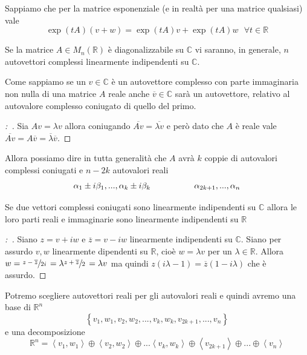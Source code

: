 \documentclass[11pt,a4paper,twoside]{book}
\newenvironment{dimo}[1][\proofname]{
	\begin{tcolorbox}[
	breakable, 
	enhanced, 
	interior hidden, 
	frame hidden, 
	borderline west = {1pt}{0pt}{gray}, 
	top=0pt, bottom=0pt, left=0pt]
\begin{proof}[#1:~]
}
{
\end{proof}
\end{tcolorbox}
}
\theoremstyle{esss}
\theoremstyle{dotless}
\numberwithin{equation}{section} %
\begin{document}
Sappiamo che per la matrice esponenziale (e in realtà per una matrice qualsiasi) vale
\[
\exp{(tA)}(v+w)=\exp{(tA)}v + \exp{(tA)}w \>\>\> \forall t\in\mathbb{R}
\]

Se la matrice $A\in M_n(\mathbb{R})$ è diagonalizzabile su $\mathbb{C}$ vi saranno, in generale, $n$ autovettori complessi linearmente indipendenti su $\mathbb{C}$.

Come sappiamo se un $v\in \mathbb{C}$ è un autovettore complesso con parte immaginaria non nulla di una matrice $A$ reale  anche $\overline{v}\in\mathbb{C}$ sarà un autovettore, relativo al autovalore complesso coniugato di quello del primo.
\begin{dimo}
Sia $Av=\lambda v$ allora coniugando $\overline{Av}=\overline{\lambda v}$ e però dato che $A$ è reale vale $\overline{Av}=A\overline{v}=\overline{\lambda}\overline{v}$.
\end{dimo}

Allora possiamo dire in tutta generalità che $A$ avrà $k$ coppie di autovalori complessi coniugati e $n-2k$ autovalori reali
\[
\alpha_1 \pm i \beta_1 ,..., \alpha_k \pm i \beta_k \hspace{0.15\linewidth} \alpha_{2k+1},...,\alpha_n
\]


Se due vettori complessi coniugati sono linearmente indipendenti su $\mathbb{C}$ allora le loro parti reali e immaginarie sono linearmente indipendenti su $\mathbb{R}$
\begin{dimo}
Siano $z=v+iw$ e $\overline{z}=v-iw$ linearmente indipendenti su $\mathbb{C}$. Siano per assurdo $v,w$ linearmente dipendenti su $\mathbb{R}$, cioè $w=\lambda v$ per un $\lambda\in\mathbb{R}$. Allora $w=\sfrac{z-\overline{z}}{2i} \, =\lambda \sfrac{z+\overline{z}}{2}\,=\lambda v$ ma quindi $z(i\lambda-1)=\overline{z}(1-i\lambda)$ che è assurdo.
\end{dimo}
Potremo scegliere autovettori reali per gli autovalori reali e quindi avremo una base di $\mathbb{R}^n$
\begin{equation}\label{base decomposizione invarianti}
\left\{
v_1,w_1,v_2,w_2,...,v_k,w_k,v_{2k+1},...,v_n
\right\}
\end{equation}
e una decomposizione
\begin{equation}\label{decomposizione invarianti}
\mathbb{R}^n= \left\langle v_1,w_1 \right\rangle \oplus \left\langle v_2,w_2 \right\rangle \oplus ... \left\langle v_k,w_k \right\rangle \oplus \left\langle v_{2k+1} \right\rangle \oplus ... \oplus \left\langle v_{n} \right\rangle 
\end{equation}
\end{document}
